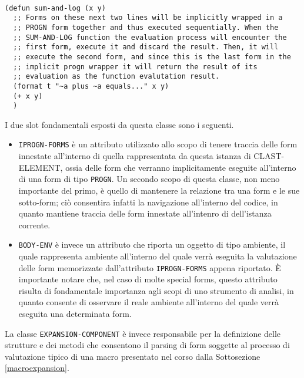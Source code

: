 \begin{lstlisting}[caption=Esempio di costrutto che fa utilizzo di del
costrutto PROGN in modo implicito]

(defun sum-and-log (x y)
  ;; Forms on these next two lines will be implicitly wrapped in a
  ;; PROGN form together and thus executed sequentially. When the
  ;; SUM-AND-LOG function the evaluation process will encounter the
  ;; first form, execute it and discard the result. Then, it will
  ;; execute the second form, and since this is the last form in the
  ;; implicit progn wrapper it will return the result of its
  ;; evaluation as the function evalutation result.
  (format t "~a plus ~a equals..." x y)
  (+ x y)
  )

\end{lstlisting}

I due slot fondamentali esposti da questa classe sono i seguenti.

\begin{itemize}

\item \texttt{IPROGN-FORMS} è un attributo utilizzato allo scopo di tenere
traccia delle form innestate all’interno di quella rappresentata da questa
istanza di CLAST-ELEMENT, ossia delle form che verranno implicitamente
eseguite all’interno di una form di tipo \texttt{PROGN}. Un secondo scopo di
questa classe, non meno importante del primo, è quello di mantenere la
relazione tra una form e le sue sotto-form; ciò consentira infatti la
navigazione all'interno del codice, in quanto mantiene traccia delle form
innestate all'intenro di dell'istanza corrente.

\item \texttt{BODY-ENV} è invece un attributo che riporta un oggetto di tipo
ambiente, il quale rappresenta ambiente all’interno del quale verrà eseguita
la valutazione delle form memorizzate dall’attributo \texttt {IPROGN-FORMS}
appena riportato. È importante notare che, nel caso di molte special forms,
questo attributo risulta di fondamentale importanza agli scopi di uno
strumento di analisi, in quanto consente di osservare il reale ambiente
all'interno del quale verrà eseguita una determinata form.

\end{itemize}

La classe \texttt{EXPANSION-COMPONENT} è invece responsabile per la
definizione delle strutture e dei metodi che consentono il parsing di form
soggette al processo di valutazione tipico di una macro presentato nel corso
dalla Sottosezione \ref{macroexpansion}.

